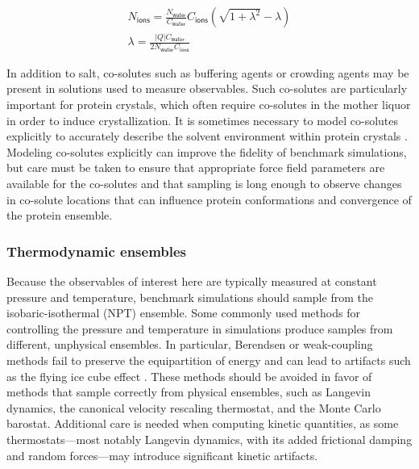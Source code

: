 \documentclass[9pt,review,pubversion]{livecoms}
\begin{document}
\begin{equation}
\label{eqn:ions_charged}
\begin{gathered}
N_{\mathsf{ions}} = \frac {N_{\mathsf{water}}} {C_{\mathsf{water}}} C_{\mathsf{ions}} \left( \sqrt{1 + \lambda^2} - \lambda \right) \\
\lambda = \frac {\left| Q \right| C_{\mathsf{water}}} {2 N_{\mathsf{water}} C_{\mathsf{ions}}}
\end{gathered}
\end{equation}

In addition to salt, co-solutes such as buffering agents or crowding agents may be present in solutions used to measure observables.
Such co-solutes are particularly important for protein crystals, which often require co-solutes in the mother liquor in order to induce crystallization.
It is sometimes necessary to model co-solutes explicitly to accurately describe the solvent environment within protein crystals \cite{wall_biomolecular_2019}.
Modeling co-solutes explicitly can improve the fidelity of benchmark simulations, but care must be taken to ensure that appropriate force field parameters are available for the co-solutes and that sampling is long enough to observe changes in co-solute locations that can influence protein conformations and convergence of the protein ensemble.

\subsubsection{Thermodynamic ensembles}
\label{sub2:ensembles}

Because the observables of interest here are typically measured at constant pressure and temperature, benchmark simulations should sample from the isobaric-isothermal (NPT) ensemble.
Some commonly used methods for controlling the pressure and temperature in simulations produce samples from different, unphysical ensembles.
In particular, Berendsen or weak-coupling methods fail to preserve the equipartition of energy and can lead to artifacts such as the flying ice cube effect \cite{harvey_flying_1998,braun_anomalous_2018}.
These methods should be avoided in favor of methods that sample correctly from physical ensembles, such as Langevin dynamics, the canonical velocity rescaling thermostat, and the Monte Carlo barostat.
Additional care is needed when computing kinetic quantities, as some thermostats---most notably Langevin dynamics, with its added frictional damping and random forces---may introduce significant kinetic artifacts.
\end{document}
